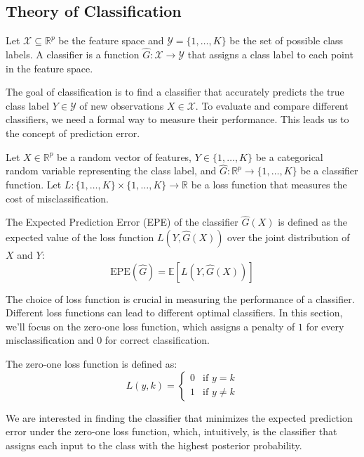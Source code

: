 \subsection{Theory of Classification}

\begin{definition}
Let $\mathcal{X} \subseteq \mathbb{R}^p$ be the feature space and $\mathcal{Y} = \{1,\ldots,K\}$ be the set of possible class labels. A classifier is a function $\hat{G}: \mathcal{X} \to \mathcal{Y}$ that assigns a class label to each point in the feature space.
\end{definition}

The goal of classification is to find a classifier that accurately predicts the true class label $Y \in \mathcal{Y}$ of new observations $X \in \mathcal{X}$. To evaluate and compare different classifiers, we need a formal way to measure their performance. This leads us to the concept of prediction error.

\begin{definition}
Let $X \in \mathbb{R}^p$ be a random vector of features, $Y \in \{1,\ldots,K\}$ be a categorical random variable representing the class label, and $\hat{G}: \mathbb{R}^p \to \{1,\ldots,K\}$ be a classifier function. Let $L: \{1,\ldots,K\} \times \{1,\ldots,K\} \to \mathbb{R}$ be a loss function that measures the cost of misclassification.

    The Expected Prediction Error (EPE) of the classifier $\hat{G}(X)$ is defined as the expected value of the loss function $L(Y, \hat{G}(X))$ over the joint distribution of $X$ and $Y$:
\[
\text{EPE}(\hat{G}) = \mathbb{E}[L(Y, \hat{G}(X))]
\]
\end{definition}

The choice of loss function is crucial in measuring the performance of a classifier. Different loss functions can lead to different optimal classifiers. In this section, we'll focus on the zero-one loss function, which assigns a penalty of $1$ for every misclassification and $0$ for correct classification.

\begin{definition}
The zero-one loss function is defined as:
\[
L(y, k) = \begin{cases}
0 & \text{if } y = k \\
1 & \text{if } y \neq k
\end{cases}
\]
\end{definition}

We are interested in finding the classifier that minimizes the expected prediction error under the zero-one loss function, which, intuitively, is the classifier that assigns each input to the class with the highest posterior probability.

